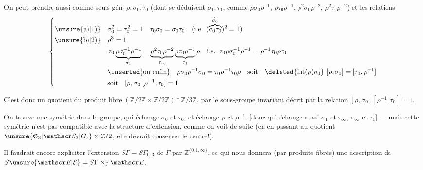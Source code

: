 
On peut prendre aussi comme seuls gén. $\rho,\sigma_0,\tau_0$ (dont se déduisent $\sigma_1,\tau_1$, \inserted{$\sigma_\infty,\tau_\infty$} comme $\rho\sigma_0\rho^{-1}$, $\rho\tau_0\rho^{-1}$, $\rho^2\sigma_0\rho^{-2}$, $\rho^2\tau_0\rho^{-2}$) et les relations
\[
\left\{\begin{aligned}
\unsure{\mathrm a)|1)}\quad&\sigma_0^2=\tau_0^2=1\quad\tau_0\sigma_0=\sigma_0\tau_0\quad(\text{i.e. }(\overbrace{\sigma_0\tau_0}^{\widetilde\sigma_0})^2=1)\\
\unsure{\mathrm b)|2)}\quad&\rho^3=1\\
&\sigma_0\underbrace{\rho\sigma_0^{-1}\rho^{-1}}_{\sigma_1}=\underbrace{\rho^2\tau_0\rho^{-2}}_{\tau_\infty}\underbrace{\rho\tau_0\rho^{-1}}_{\tau_1}\rho\quad\text{i.e. }\sigma_0\rho\sigma_0^{-1}\rho^{-1}=\rho^{-1}\tau_0\rho\tau_0\\
&\inserted{\text{ou enfin}}\quad\rho\sigma_0\rho^{-1}\sigma_0=\tau_0\rho^{-1}\tau_0\rho\quad\text{soit}\quad\deleted{\operatorname{int}(\rho)\sigma_0}\ [\rho,\sigma_0]=[\tau_0,\rho^{-1}]\\
&\text{soit}\quad[\rho,\sigma_0][\rho^{-1},\tau_0]=1
\end{aligned}\right.
\]

C'est donc un quotient du produit libre $(\mathbb Z/2\mathbb Z\times\mathbb Z/2\mathbb Z)*\mathbb Z/3\mathbb Z$, par le sous-groupe invariant décrit par la relation $[\rho,\sigma_0][\rho^{-1},\tau_0]=1$.

On trouve une symétrie dans le groupe, qui échange $\sigma_0$ et $\tau_0$, et échange $\rho$ et $\rho^{-1}$. [donc qui échange aussi $\sigma_1$ et $\tau_\infty$, $\sigma_\infty$ et $\tau_1$] --- mais cette symétrie n'est pas compatible avec la structure d'extension, comme on voit  de suite (en en passant au quotient $\unsure{\mathfrak S_3|\mathscr S_3|G_3}\times\mathbb Z/2$, elle devrait conserver le centre!).

Il faudrait encore expliciter l'extension $S\Gamma=S\Gamma_{0,3}$ de $\Gamma$ par $\mathbb Z^{\{0,1,\infty\}}$, ce qui nous donnera (par produits fibrés) une description de $S\unsure{\mathscr E|\mathcal E}=S\Gamma\times_\Gamma\mathscr E$.


